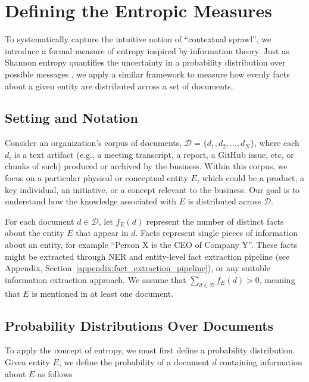 \documentclass[11pt,a4paper]{article}
\begin{document}
\FloatBarrier
\section{Defining the Entropic Measures} \label{sec:defining_entropic_measures}

To systematically capture the intuitive notion of ``contextual sprawl'', we introduce a formal measure of entropy inspired by information theory. Just as Shannon entropy quantifies the uncertainty in a probability distribution over possible messages \cite{shannon1948mathematical}, we apply a similar framework to measure how evenly facts about a given entity are distributed across a set of documents.

\subsection{Setting and Notation}

Consider an organization's corpus of documents, $\mathcal{D} = \{d_1, d_2, \ldots, d_N\}$, where each $d_i$ is a text artifact (e.g., a meeting transcript, a report, a GitHub issue, etc, or chunks of such) produced or archived by the business. Within this corpus, we focus on a particular physical or conceptual entity \cite{ratinov2009design} $E$, which could be a product, a key individual, an initiative, or a concept relevant to the business. Our goal is to understand how the knowledge associated with $E$ is distributed across $\mathcal{D}$.

For each document $d \in \mathcal{D}$, let $f_{E}(d)$ represent the number of distinct facts about the entity $E$ that appear in $d$. Facts represent single pieces of information about an entity, for example ``Person X is the CEO of Company Y''. These facts might be extracted through NER and entity-level fact extraction pipeline (see Appendix, Section~\ref{appendix:fact_extraction_pipeline}), or any suitable information extraction approach. We assume that $\sum_{d \in \mathcal{D}} f_{E}(d) > 0$, meaning that $E$ is mentioned in at least one document.

\subsection{Probability Distributions Over Documents}

To apply the concept of entropy, we must first define a probability distribution. Given entity $E$, we define the probability of a document $d$ containing information about $E$ as follows
\end{document}

